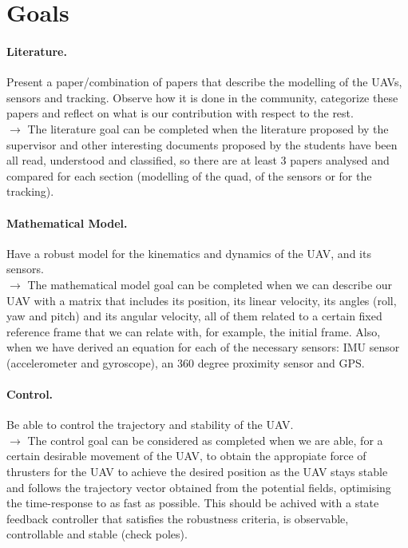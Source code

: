 \documentclass{article}
\begin{document}
	\section{Goals}		 %
	
		\paragraph{Literature.} Present a paper/combination of papers that describe the modelling of the UAVs, sensors and tracking. Observe how it is done in the community, categorize these papers and reflect on what is our contribution with respect to the rest.\\  
		$\rightarrow$ The literature goal can be completed when the literature proposed by the supervisor and other interesting documents proposed by the students have been all read, understood and classified, so there are at least 3 papers analysed and compared for each section (modelling of the quad, of the sensors or for the tracking).
	
		\paragraph{Mathematical Model.} Have a robust model for the kinematics and dynamics of the UAV, and its sensors.\\
		$\rightarrow$ The mathematical model goal can be completed when we can describe our UAV with a matrix that includes its position, its linear velocity, its angles (roll, yaw and pitch) and its angular velocity, all of them related to a certain fixed reference frame that we can relate with, for example, the initial frame. Also, when we have derived an equation for each of the necessary sensors: IMU sensor (accelerometer and gyroscope), an 360 degree proximity sensor and GPS. %
		
		\paragraph{Control.} Be able to control the trajectory and stability of the UAV. \\
		$\rightarrow$ The control goal can be considered as completed when we are able, for a certain desirable movement of the UAV, to obtain the appropiate force of thrusters for the UAV to achieve the desired position as the UAV stays stable and follows the trajectory vector obtained from the potential fields, optimising the time-response to as fast as possible. This should be achived with a state feedback controller that satisfies the robustness criteria, is observable, controllable and stable (check poles). %
		
\end{document}
